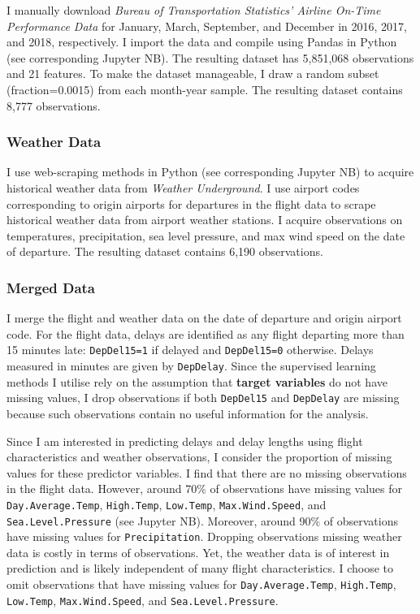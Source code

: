 \documentclass[
]{article}
\begin{document}
I manually download
\textit{Bureau of Transportation Statistics' Airline On-Time Performance Data}
for January, March, September, and December in 2016, 2017, and 2018,
respectively. I import the data and compile using Pandas in Python (see
corresponding Jupyter NB). The resulting dataset has 5,851,068
observations and 21 features. To make the dataset manageable, I draw a
random subset (fraction=0.0015) from each month-year sample. The
resulting dataset contains 8,777 observations.

\subsubsection{Weather Data}

I use web-scraping methods in Python (see corresponding Jupyter NB) to
acquire historical weather data from \textit{Weather Underground}. I use
airport codes corresponding to origin airports for departures in the
flight data to scrape historical weather data from airport weather
stations. I acquire observations on temperatures, precipitation, sea
level pressure, and max wind speed on the date of departure. The
resulting dataset contains 6,190 observations.

\subsubsection{Merged Data}

I merge the flight and weather data on the date of departure and origin
airport code. For the flight data, delays are identified as any flight
departing more than 15 minutes late: \texttt{DepDel15=1} if delayed and
\texttt{DepDel15=0} otherwise. Delays measured in minutes are given by
\texttt{DepDelay}. Since the supervised learning methods I utilise rely
on the assumption that \textbf{target variables} do not have missing
values, I drop observations if both \texttt{DepDel15} and
\texttt{DepDelay} are missing because such observations contain no
useful information for the analysis.

Since I am interested in predicting delays and delay lengths using
flight characteristics and weather observations, I consider the
proportion of missing values for these predictor variables. I find that
there are no missing observations in the flight data. However, around
70\% of observations have missing values for \texttt{Day.Average.Temp},
\texttt{High.Temp}, \texttt{Low.Temp}, \texttt{Max.Wind.Speed}, and
\texttt{Sea.Level.Pressure} (see Jupyter NB). Moreover, around 90\% of
observations have missing values for \texttt{Precipitation}. Dropping
observations missing weather data is costly in terms of observations.
Yet, the weather data is of interest in prediction and is likely
independent of many flight characteristics. I choose to omit
observations that have missing values for \texttt{Day.Average.Temp},
\texttt{High.Temp}, \texttt{Low.Temp}, \texttt{Max.Wind.Speed}, and
\texttt{Sea.Level.Pressure}.\\
\end{document}
